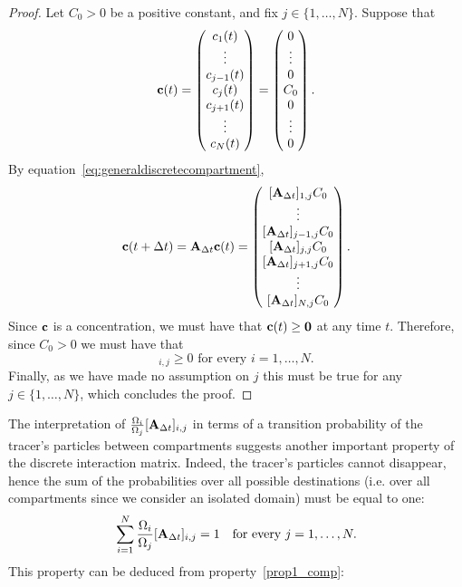 \begin{proof}
	Let $C_0 > 0$ be a positive constant, and fix $j \in \{1,\dots,N\}$. Suppose that 
	\begin{equation}
		\mathbf c(t) = \begin{pmatrix} c_1(t) \\ \vdots \\ c_{j-1}(t) \\ c_j(t) \\ c_{j+1}(t) \\ \vdots \\ c_N(t) \end{pmatrix}
				= \begin{pmatrix} 0 \\ \vdots \\ 0 \\ C_0 \\ 0 \\ \vdots \\ 0 \end{pmatrix}.
	\end{equation}
	By equation~\eqref{eq:generaldiscretecompartment},
	\begin{equation}
		\b c(t+\Delta t) = \b A_{\Delta t} \b c(t) = \begin{pmatrix} [\b A_{\Delta t}]_{1,j} C_0 \\ \vdots \\ [\b A_{\Delta t}]_{j-1,j}C_0  \\ [\b A_{\Delta t}]_{j,j} C_0 \\ [\b A_{\Delta t}]_{j+1,j}C_0 \\ \vdots \\ [\b A_{\Delta t}]_{N,j} C_0 \end{pmatrix}.
	\end{equation}
	Since $\mathbf c$ is a concentration, we must have that $\mathbf c(t) \ge \mathbf 0$ at any time $t$. Therefore, since $C_0 > 0$ we must have that
	\begin{equation}
		[\b A_{\Delta t}]_{i,j} \ge 0 \mbox{ for every } i = 1,\dots,N.
	\end{equation}
	Finally, as we have made no assumption on $j$ this must be true for any $j \in \{1,\dots,N\}$, which concludes the proof.
\end{proof}
The interpretation of $\frac{\Omega_i}{\Omega_j}[\mathbf A_{\Delta t}]_{i,j}$ in terms of a transition probability of the tracer's particles between compartments suggests another important property of the discrete interaction matrix. Indeed, the tracer's particles cannot disappear, hence the sum of the probabilities over all possible destinations (i.e. over all compartments since we consider an isolated domain) must be equal to one:
\begin{equation}
	\sum_{i=1}^N \frac{\Omega_i}{\Omega_j}[\mathbf A_{\Delta t}]_{i,j} = 1 \quad \mbox{for every } j=1,\dots,N.
\end{equation}
This property can be deduced from property~\ref{prop1_comp}:

